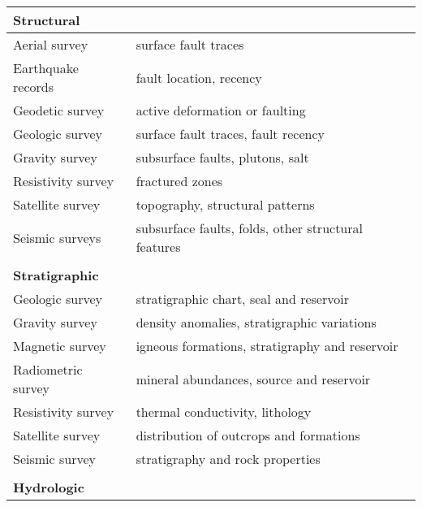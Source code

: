 \begin{table}[!htp]
\begin{tabular}{ll}
\textbf{Structural}     & \textbf{}                                                \\ \hline
Aerial survey           & surface fault traces                                     \\
Earthquake records      & fault location, recency                                  \\
Geodetic survey         & active deformation or faulting                           \\
Geologic survey         & surface fault traces, fault recency                      \\
Gravity survey          & subsurface faults, plutons, salt                         \\
Resistivity survey      & fractured zones                                          \\
Satellite survey        & topography, structural patterns                          \\
Seismic surveys         & subsurface faults, folds, other structural features      \\
                        &                                                          \\
\textbf{Stratigraphic}  &                                                          \\ \hline
Geologic survey         & stratigraphic chart, seal and reservoir                  \\
Gravity survey          & density anomalies, stratigraphic variations              \\
Magnetic survey         & igneous formations, stratigraphy and reservoir           \\
Radiometric survey      & mineral abundances, source and reservoir                 \\
Resistivity survey      & thermal conductivity, lithology                          \\
Satellite survey        & distribution of outcrops and formations                  \\
Seismic survey          & stratigraphy and rock properties                         \\
                        &                                                          \\
\textbf{Hydrologic}     &                                                          \\ \hline

\end{tabular}
\end{table}
